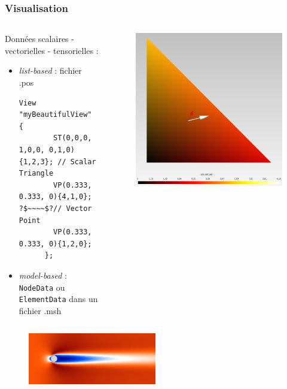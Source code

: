 \documentclass[aspectratio=169]{beamer}
\begin{document}
\begin{frame}[fragile]
\frametitle{Visualisation}
\begin{columns}
  \begin{column}{0.8\linewidth}
    \hspace{0.5cm}
    Données scalaires - vectorielles - tensorielles :
    \begin{itemize}
      \item \textit{list-based} : fichier .pos
      \begin{lstlisting}[frame=none, aboveskip=0mm, belowskip=0mm, escapechar=?]
      View "myBeautifulView" {
        ST(0,0,0, 1,0,0, 0,1,0){1,2,3}; // Scalar Triangle
        VP(0.333, 0.333, 0){4,1,0}; ?$~~~~$?// Vector Point
        VP(0.333, 0.333, 0){1,2,0};
      };
      \end{lstlisting}
      \item \textit{model-based} : \texttt{NodeData} ou \texttt{ElementData} dans un fichier .msh
    \end{itemize}
  \end{column}
  \begin{column}{0.5\linewidth}
    \begin{figure}
      \hspace{-3cm}
      \includegraphics[width=0.5\linewidth]{figures/visu.png}
      \caption{}
      \label{}
    \end{figure}
  \end{column}
\end{columns}
\begin{figure}
  \vspace{-0.7cm}
  \includegraphics[width=0.5\textwidth]{figures/solU_flow.png}

\end{figure}
\end{frame}
\end{document}
